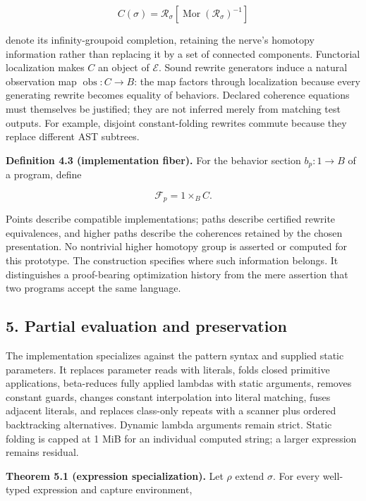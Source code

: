 \documentclass[
  11pt,
]{article}
\begin{document}
\[ C(\sigma)=\mathcal R_\sigma[\operatorname{Mor}(\mathcal R_\sigma)^{-1}] \]

denote its infinity-groupoid completion, retaining the nerve's homotopy
information rather than replacing it by a set of connected components.
Functorial localization makes \(C\) an object of \(\mathcal E\). Sound
rewrite generators induce a natural observation map
\(\operatorname{obs}:C\to B\): the map factors through localization
because every generating rewrite becomes equality of behaviors. Declared
coherence equations must themselves be justified; they are not inferred
merely from matching test outputs. For example, disjoint
constant-folding rewrites commute because they replace different AST
subtrees.

\textbf{Definition 4.3 (implementation fiber).} For the behavior section
\(b_p:1\to B\) of a program, define

\[ \mathcal F_p=1\mathbin{\times}_{B} C. \]

Points describe compatible implementations; paths describe certified
rewrite equivalences, and higher paths describe the coherences retained
by the chosen presentation. No nontrivial higher homotopy group is
asserted or computed for this prototype. The construction specifies
where such information belongs. It distinguishes a proof-bearing
optimization history from the mere assertion that two programs accept
the same language.

\hypertarget{partial-evaluation-and-preservation}{%
\subsection{5. Partial evaluation and
preservation}\label{partial-evaluation-and-preservation}}

The implementation specializes against the pattern syntax and supplied
static parameters. It replaces parameter reads with literals, folds
closed primitive applications, beta-reduces fully applied lambdas with
static arguments, removes constant guards, changes constant
interpolation into literal matching, fuses adjacent literals, and
replaces class-only repeats with a scanner plus ordered backtracking
alternatives. Dynamic lambda arguments remain strict. Static folding is
capped at 1 MiB for an individual computed string; a larger expression
remains residual.

\textbf{Theorem 5.1 (expression specialization).} Let \(\rho\) extend
\(\sigma\). For every well-typed expression and capture environment,
\end{document}
